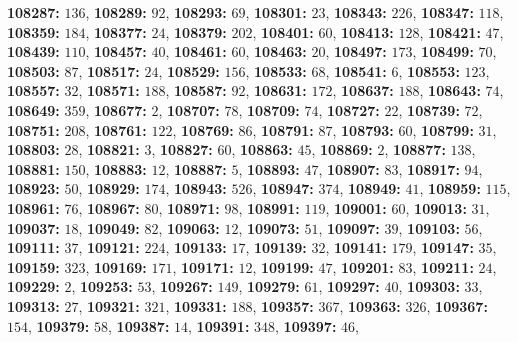 \textsf{\bfseries 108287:} $136$, \textsf{\bfseries 108289:} $92$, \textsf{\bfseries 108293:} $69$, \textsf{\bfseries 108301:} $23$, \textsf{\bfseries 108343:} $226$, \textsf{\bfseries 108347:} $118$, \textsf{\bfseries 108359:} $184$, \textsf{\bfseries 108377:} $24$, \textsf{\bfseries 108379:} $202$, \textsf{\bfseries 108401:} $60$, \textsf{\bfseries 108413:} $128$, \textsf{\bfseries 108421:} $47$, \textsf{\bfseries 108439:} $110$, \textsf{\bfseries 108457:} $40$, \textsf{\bfseries 108461:} $60$, \textsf{\bfseries 108463:} $20$, \textsf{\bfseries 108497:} $173$, \textsf{\bfseries 108499:} $70$, \textsf{\bfseries 108503:} $87$, \textsf{\bfseries 108517:} $24$, \textsf{\bfseries 108529:} $156$, \textsf{\bfseries 108533:} $68$, \textsf{\bfseries 108541:} $6$, \textsf{\bfseries 108553:} $123$, \textsf{\bfseries 108557:} $32$, \textsf{\bfseries 108571:} $188$, \textsf{\bfseries 108587:} $92$, \textsf{\bfseries 108631:} $172$, \textsf{\bfseries 108637:} $188$, \textsf{\bfseries 108643:} $74$, \textsf{\bfseries 108649:} $359$, \textsf{\bfseries 108677:} $2$, \textsf{\bfseries 108707:} $78$, \textsf{\bfseries 108709:} $74$, \textsf{\bfseries 108727:} $22$, \textsf{\bfseries 108739:} $72$, \textsf{\bfseries 108751:} $208$, \textsf{\bfseries 108761:} $122$, \textsf{\bfseries 108769:} $86$, \textsf{\bfseries 108791:} $87$, \textsf{\bfseries 108793:} $60$, \textsf{\bfseries 108799:} $31$, \textsf{\bfseries 108803:} $28$, \textsf{\bfseries 108821:} $3$, \textsf{\bfseries 108827:} $60$, \textsf{\bfseries 108863:} $45$, \textsf{\bfseries 108869:} $2$, \textsf{\bfseries 108877:} $138$, \textsf{\bfseries 108881:} $150$, \textsf{\bfseries 108883:} $12$, \textsf{\bfseries 108887:} $5$, \textsf{\bfseries 108893:} $47$, \textsf{\bfseries 108907:} $83$, \textsf{\bfseries 108917:} $94$, \textsf{\bfseries 108923:} $50$, \textsf{\bfseries 108929:} $174$, \textsf{\bfseries 108943:} $526$, \textsf{\bfseries 108947:} $374$, \textsf{\bfseries 108949:} $41$, \textsf{\bfseries 108959:} $115$, \textsf{\bfseries 108961:} $76$, \textsf{\bfseries 108967:} $80$, \textsf{\bfseries 108971:} $98$, \textsf{\bfseries 108991:} $119$, \textsf{\bfseries 109001:} $60$, \textsf{\bfseries 109013:} $31$, \textsf{\bfseries 109037:} $18$, \textsf{\bfseries 109049:} $82$, \textsf{\bfseries 109063:} $12$, \textsf{\bfseries 109073:} $51$, \textsf{\bfseries 109097:} $39$, \textsf{\bfseries 109103:} $56$, \textsf{\bfseries 109111:} $37$, \textsf{\bfseries 109121:} $224$, \textsf{\bfseries 109133:} $17$, \textsf{\bfseries 109139:} $32$, \textsf{\bfseries 109141:} $179$, \textsf{\bfseries 109147:} $35$, \textsf{\bfseries 109159:} $323$, \textsf{\bfseries 109169:} $171$, \textsf{\bfseries 109171:} $12$, \textsf{\bfseries 109199:} $47$, \textsf{\bfseries 109201:} $83$, \textsf{\bfseries 109211:} $24$, \textsf{\bfseries 109229:} $2$, \textsf{\bfseries 109253:} $53$, \textsf{\bfseries 109267:} $149$, \textsf{\bfseries 109279:} $61$, \textsf{\bfseries 109297:} $40$, \textsf{\bfseries 109303:} $33$, \textsf{\bfseries 109313:} $27$, \textsf{\bfseries 109321:} $321$, \textsf{\bfseries 109331:} $188$, \textsf{\bfseries 109357:} $367$, \textsf{\bfseries 109363:} $326$, \textsf{\bfseries 109367:} $154$, \textsf{\bfseries 109379:} $58$, \textsf{\bfseries 109387:} $14$, \textsf{\bfseries 109391:} $348$, \textsf{\bfseries 109397:} $46$, 
